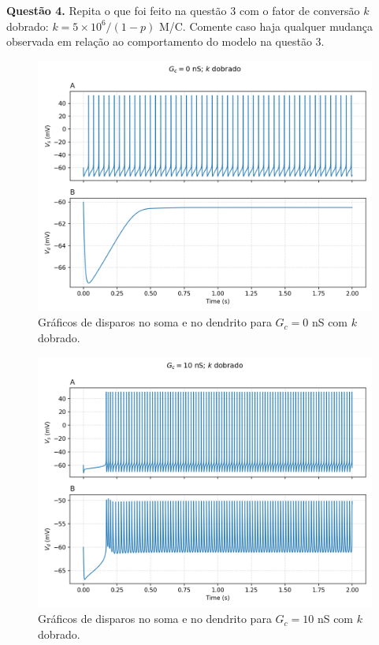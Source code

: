 \documentclass[english,11pt,a4paper]{article}
\begin{document}
	
	
	\noindent \textbf{Questão 4.} Repita o que foi feito na questão 3 com o fator de conversão \(k\) dobrado: \(k = 5 \times 10^6 / (1 - p)\) M/C. Comente caso haja qualquer mudança observada em relação ao comportamento do modelo na questão 3.
	
	\begin{figure}[H]
		\centering
		\includegraphics[width=12cm]{../figures/ex_4_gc0.png}
		\caption{Gráficos de disparos no soma e no dendrito para $G_c = 0$ nS com $k$ dobrado.}
	\end{figure}
	
	\begin{figure}[H]
		\centering
		\includegraphics[width=12cm]{../figures/ex_4_gc10.png}
		\caption{Gráficos de disparos no soma e no dendrito para $G_c = 10$ nS com $k$ dobrado.}
	\end{figure}
	
\end{document}

